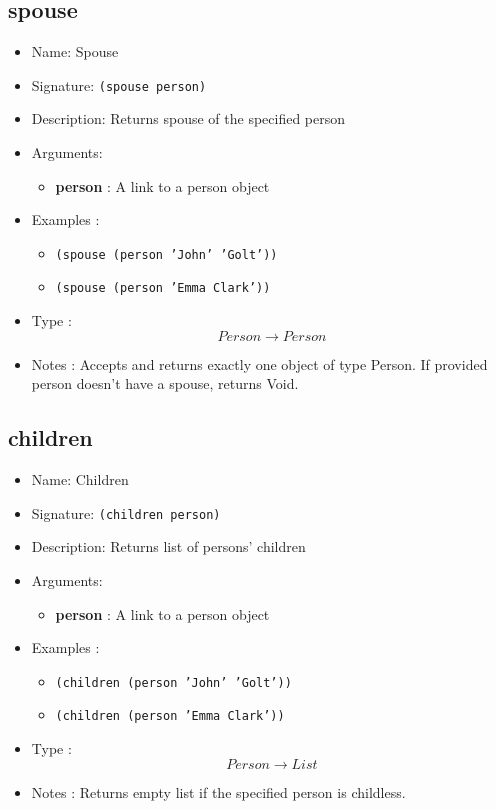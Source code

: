 \subsection{spouse}
\begin{itemize}
    \item Name: Spouse
    \item Signature: \texttt{(spouse person)}
    \item Description: Returns spouse of the specified person
    \item Arguments:
        \begin{itemize}
            \item \textbf{person} : A link to a person object
        \end{itemize}
    \item Examples :
        \begin{itemize}
            \item \texttt{(spouse (person 'John' 'Golt'))}
            \item \texttt{(spouse (person 'Emma Clark'))}
        \end{itemize}
    \item Type : \[Person \to Person\]
    \item Notes : Accepts and returns exactly one object of type Person. If provided person doesn't have a spouse, returns Void.
\end{itemize}

\subsection{children}
\begin{itemize}
    \item Name: Children
    \item Signature: \texttt{(children person)}
    \item Description: Returns list of persons' children
    \item Arguments:
        \begin{itemize}
            \item \textbf{person} : A link to a person object
        \end{itemize}
    \item Examples :
        \begin{itemize}
            \item \texttt{(children (person 'John' 'Golt'))}
            \item \texttt{(children (person 'Emma Clark'))}
        \end{itemize}
    \item Type : \[Person \to List\]
    \item Notes : Returns empty list if the specified person is childless.
\end{itemize}

